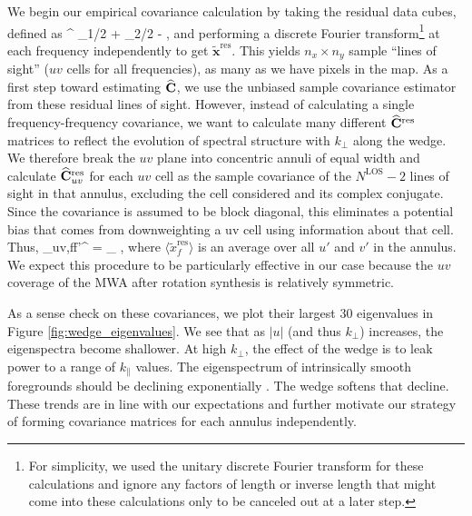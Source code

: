 We begin our empirical covariance calculation by taking the residual data cubes, defined as
\beq
\xhat^ \equiv \xhat_1/2 + \xhat_2/2 - \mean,
\eeq
and performing a discrete Fourier transform\footnote{For simplicity, we used the unitary discrete Fourier transform for these calculations and ignore any factors of length or inverse length that might come into these calculations only to be canceled out at a later step.} at each frequency independently to get $\widetilde{\mathbf{x}}^\text{res}$. This yields $n_x\times n_y$ sample ``lines of sight'' ($uv$ cells for all frequencies), as many as we have pixels in the map. As a first step toward estimating $\widehat{\mathbf{C}}$, we use the unbiased sample covariance estimator from these residual lines of sight. However, instead of calculating a single frequency-frequency covariance, we want to calculate many different $\widehat{\mathbf{C}}^\text{res}$ matrices to reflect the evolution of spectral structure with $k_\perp$ along the wedge. We therefore break the $uv$ plane into concentric annuli of equal width and calculate $\widehat{\mathbf{C}}^\text{res}_{uv}$ for each $uv$ cell as the sample covariance of the $N^\text{LOS} - 2$ lines of sight in that annulus, excluding the cell considered and its complex conjugate. Since the covariance is assumed to be block diagonal, this eliminates a potential bias that comes from downweighting a uv cell using information about that cell. Thus,
\beq
{}_{uv,ff'}^ = \hspace{-3mm}\sum_{} \hspace{-3mm} , \label{eq:CovEstOtherAnnuli}
\eeq
where $\langle \widetilde{x}^\text{res}_f \rangle$ is an average over all $u'$ and $v'$ in the annulus. We expect this procedure to be particularly effective in our case because the $uv$ coverage of the MWA after rotation synthesis is relatively symmetric.

As a sense check on these covariances, we plot their largest 30 eigenvalues in Figure \ref{fig:wedge_eigenvalues}. We see that as $|u|$ (and thus $k_\perp$) increases, the eigenspectra become shallower. At high $k_\perp$, the effect of the wedge is to leak power to a range of $k_\|$ values. The eigenspectrum of intrinsically smooth foregrounds should be declining exponentially \cite{AdrianForegrounds}. The wedge softens that decline. These trends are in line with our expectations and further motivate our strategy of forming covariance matrices for each annulus independently. 

